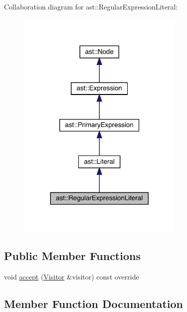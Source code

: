 Collaboration diagram for ast\+:\+:Regular\+Expression\+Literal\+:\nopagebreak
\begin{figure}[H]
\begin{center}
\leavevmode
\includegraphics[width=227pt]{structast_1_1_regular_expression_literal__coll__graph}
\end{center}
\end{figure}
\subsection*{Public Member Functions}
\begin{DoxyCompactItemize}
\item 
void \hyperlink{structast_1_1_regular_expression_literal_a9c7a0f861cceb2eee93a420955f54e36}{accept} (\hyperlink{structast_1_1_visitor}{Visitor} \&visitor) const override
\end{DoxyCompactItemize}


\subsection{Member Function Documentation}
\mbox{\label{structast_1_1_regular_expression_literal_a9c7a0f861cceb2eee93a420955f54e36}} 
